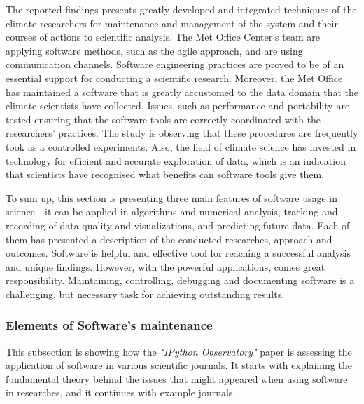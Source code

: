 The reported findings presents greatly developed and integrated techniques of the climate researchers for maintenance and management of the system and their courses of actions to scientific analysis. The Met Office Center's team are applying software methods, such as the agile approach, and are using communication channels. Software engineering practices are proved to be of an essential support for conducting a scientific research. Moreover, the Met Office has maintained a software that is greatly accustomed to the data domain that the climate scientists have collected. Issues, such as performance and portability are tested ensuring that the software tools are correctly coordinated with the researchers' practices. The study is observing that these procedures are frequently took as a controlled experiments. Also, the field of climate science has invested in technology for efficient and accurate exploration of data, which is an indication that scientists have recognised what benefits can software tools give them. \cite{easterbrook2009engineering}

To sum up, this section is presenting three main features of software usage in science - it can be applied in algorithms and numerical analysis, tracking and recording of data quality and visualizations, and predicting future data. Each of them has presented a description of the conducted researches, approach and outcomes. Software is helpful and effective tool for reaching a successful analysis and unique findings. However, with the powerful applications, comes great responsibility. Maintaining, controlling, debugging and documenting software is a challenging, but necessary task for achieving outstanding results. 

\subsubsection{Elements of Software's maintenance}

This subsection is showing how the \textit{"IPython Observatory"} paper is assessing the application of software in various scientific journals. It starts with explaining the fundamental theory behind the issues that might appeared when using software in researches, and it continues with example journals.

